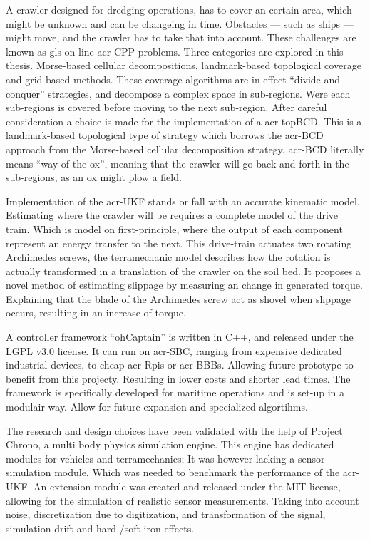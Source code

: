 A crawler designed for dredging operations, has to cover an certain area, which might be unknown and can be changeing
in time. Obstacles --- such as ships --- might move, and the crawler has to take that into account. These challenges 
are known as \gls{gls-on-line} \gls{acr-CPP} problems. Three categories are explored in this thesis. Morse-based 
cellular decompositions, landmark-based topological coverage and grid-based methods. These coverage algorithms are in
effect ``divide and conquer'' strategies, and decompose a complex space in sub-regions. Were each sub-regions is 
covered before moving to the next sub-region. After careful consideration a choice is made for the implementation of
a \gls{acr-topBCD}. This is a landmark-based topological type of strategy which borrows the \gls{acr-BCD} approach from 
the Morse-based cellular decomposition strategy. \gls{acr-BCD} literally means ``way-of-the-ox'', meaning that the 
crawler will go back and forth in the sub-regions, as an ox might plow a field.

Implementation of the \gls{acr-UKF} stands or fall with an accurate kinematic model. Estimating where the crawler 
will be requires a complete model of the drive train. Which is model on first-principle, where the output of each 
component represent an energy transfer to the next. This drive-train actuates two rotating Archimedes screws, the 
terramechanic model describes how the rotation is actually transformed in a translation of the crawler on the soil 
bed. It proposes a novel method of estimating slippage by measuring an change in generated torque. Explaining that 
the blade of the Archimedes screw act as shovel when slippage occurs, resulting in an increase of torque.

A controller framework ``ohCaptain'' is written in C++, and released under the LGPL v3.0 license. It can run on 
\gls{acr-SBC}, ranging from expensive dedicated industrial devices, to cheap \glspl{acr-Rpi} or \glspl{acr-BBB}. 
Allowing future prototype to benefit from this projecty. Resulting in lower costs and shorter lead times. The 
framework is specifically developed for maritime operations and is set-up in a modulair way. Allow for future 
expansion and specialized algortihms.

The research and design choices have been validated with the help of Project Chrono, a multi body physics simulation 
engine. This engine has dedicated modules for vehicles and terramechanics; It was however lacking a sensor simulation
module. Which was needed to benchmark the performance of the \gls{acr-UKF}. An extension module was created and 
released under the MIT license, allowing for the simulation of realistic sensor measurements. Taking into account 
noise, discretization due to digitization, and transformation of the signal, simulation drift and hard-/soft-iron 
effects.


